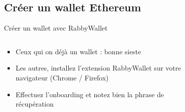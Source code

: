 \subsection{Créer un wallet Ethereum}

\begin{frame}{Créer un wallet avec RabbyWallet}
  \begin{columns}
    \begin{column}{0.7\textwidth}
      \begin{itemize}
        \item Ceux qui on déjà un wallet : bonne sieste
        \item Les autres, installez l'extension RabbyWallet sur votre navigateur (Chrome / Firefox)
        \item Effectuez l'onboarding et notez bien la phrase de récupération
      \end{itemize}
    \end{column}
    \begin{column}{0.25\textwidth}
      \begin{figure}
      \end{figure}
    \end{column}
    \begin{column}{0.05\textwidth}\end{column}
  \end{columns}
\end{frame}


